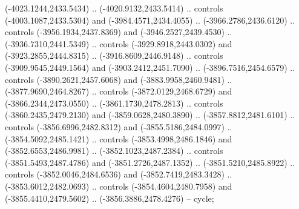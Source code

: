 \begin{scope}[shift={(430.80877,-416.69739)}]
\begin{scope}[shift={(4537.8125,-1856.4436)}]
\begin{scope}[shift={(-148.39113,-28.14259)}]
\begin{scope}[cm={{0.82632,0.0,0.0,0.82632,(-698.69811,430.29188)}}]
          (-4023.1244,2433.5434) .. (-4020.9132,2433.5414) .. controls
          (-4003.1087,2433.5304) and (-3984.4571,2434.4055) .. (-3966.2786,2436.6120) ..
          controls (-3956.1934,2437.8369) and (-3946.2527,2439.4530) ..
          (-3936.7310,2441.5349) .. controls (-3929.8918,2443.0302) and
          (-3923.2855,2444.8315) .. (-3916.8609,2446.9148) .. controls
          (-3909.9545,2449.1564) and (-3903.2412,2451.7090) .. (-3896.7516,2454.6579) ..
          controls (-3890.2621,2457.6068) and (-3883.9958,2460.9481) ..
          (-3877.9690,2464.8267) .. controls (-3872.0129,2468.6729) and
          (-3866.2344,2473.0550) .. (-3861.1730,2478.2813) .. controls
          (-3860.2435,2479.2130) and (-3859.0628,2480.3890) .. (-3857.8812,2481.6101) ..
          controls (-3856.6996,2482.8312) and (-3855.5186,2484.0997) ..
          (-3854.5092,2485.1421) .. controls (-3853.4998,2486.1846) and
          (-3852.6553,2486.9981) .. (-3852.1023,2487.2384) .. controls
          (-3851.5493,2487.4786) and (-3851.2726,2487.1352) .. (-3851.5210,2485.8922) ..
          controls (-3852.0046,2484.6536) and (-3852.7419,2483.3428) ..
          (-3853.6012,2482.0693) .. controls (-3854.4604,2480.7958) and
          (-3855.4410,2479.5602) .. (-3856.3886,2478.4276) -- cycle;


\end{scope}
\end{scope}
\end{scope}
\end{scope}
